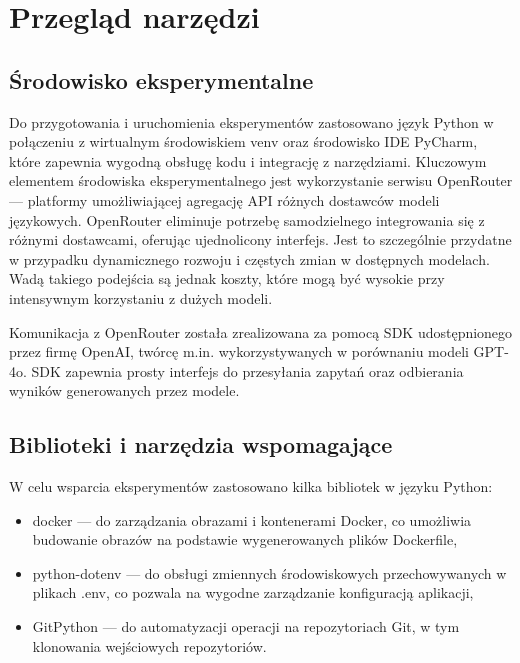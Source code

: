 \clearpage %
\section{Przegląd narzędzi}

\subsection{Środowisko eksperymentalne}

Do przygotowania i uruchomienia eksperymentów zastosowano język Python w połączeniu z wirtualnym środowiskiem venv oraz środowisko IDE PyCharm, które zapewnia wygodną obsługę kodu i integrację z narzędziami. Kluczowym elementem środowiska eksperymentalnego jest wykorzystanie serwisu OpenRouter — platformy umożliwiającej agregację API różnych dostawców modeli językowych. OpenRouter eliminuje potrzebę samodzielnego integrowania się z różnymi dostawcami, oferując ujednolicony interfejs. Jest to szczególnie przydatne w przypadku dynamicznego rozwoju i częstych zmian w dostępnych modelach. Wadą takiego podejścia są jednak koszty, które mogą być wysokie przy intensywnym korzystaniu z dużych modeli.

Komunikacja z OpenRouter została zrealizowana za pomocą SDK udostępnionego przez firmę OpenAI, twórcę m.in. wykorzystywanych w porównaniu modeli GPT-4o. SDK zapewnia prosty interfejs do przesyłania zapytań oraz odbierania wyników generowanych przez modele.

\subsection{Biblioteki i narzędzia wspomagające}

W celu wsparcia eksperymentów zastosowano kilka bibliotek w języku Python:

\begin{itemize}
    \item docker — do zarządzania obrazami i kontenerami Docker, co umożliwia budowanie obrazów na podstawie wygenerowanych plików Dockerfile,
    \item python-dotenv — do obsługi zmiennych środowiskowych przechowywanych w plikach .env, co pozwala na wygodne zarządzanie konfiguracją aplikacji,
    \item GitPython — do automatyzacji operacji na repozytoriach Git, w tym klonowania wejściowych repozytoriów.
\end{itemize}

